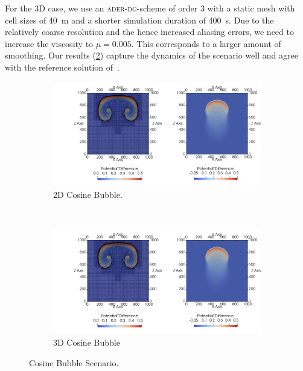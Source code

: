 \documentclass[runningheads]{llncs}
\newcommand{\aderdg}{\textsc{ader-dg}}
\begin{document}
For the 3D case, we use an \aderdg{}-scheme of order 3 with a static mesh with cell sizes of \SI{40}{\m} and a shorter simulation duration of \SI{400}{\s}.
Due to the relatively coarse resolution and the hence increased aliasing errors, we need to increase the viscosity to $\mu = 0.005$.
This corresponds to a larger amount of smoothing.
Our results (\cref{fig:cosine-3d}) capture the dynamics of the scenario well and agree with the reference solution of~\cite{kelly2012continuous}.

\begin{figure}[tb]
  \centering
  \begin{subfigure}[t]{0.5\textwidth}
    \centering
    \includegraphics[scale=0.16, trim={0cm 0 32cm 0},clip]{CP032_fig7}
    \caption{\label{fig:cosine-2d}2D Cosine Bubble.}%
  \end{subfigure}~%
  \begin{subfigure}[t]{0.5\textwidth}
    \centering
    \includegraphics[scale=0.16, trim={42cm 0 0cm 0},clip]{CP032_fig7}
    \caption{\label{fig:cosine-3d}3D Cosine Bubble}
  \end{subfigure}
  \caption{\label{fig:cosine-bubbles-results}Cosine Bubble Scenario.}
\end{figure}
\end{document}
